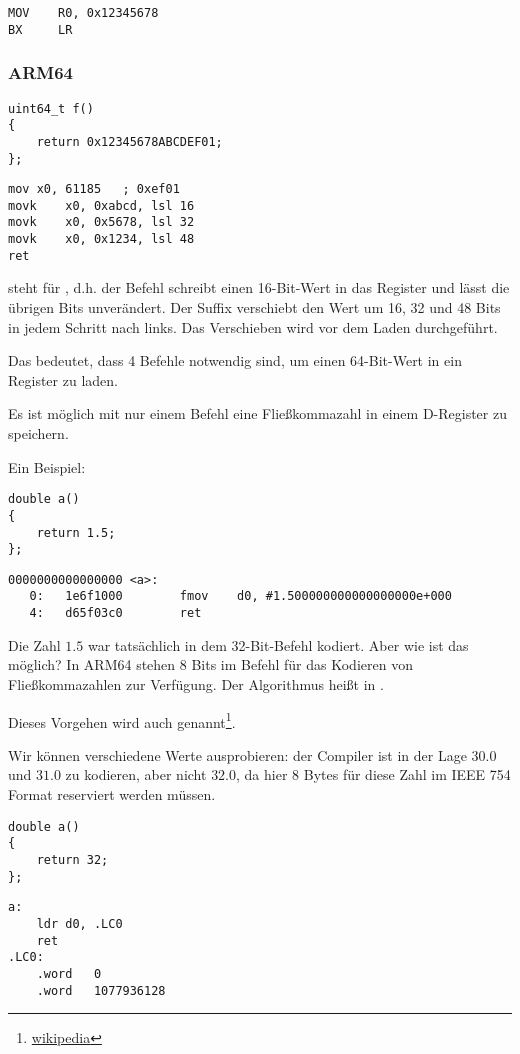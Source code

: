 \begin{lstlisting}[style=customasmARM]
MOV    R0, 0x12345678
BX     LR
\end{lstlisting}

\subsubsection{ARM64}

\begin{lstlisting}[style=customc]
uint64_t f()
{
	return 0x12345678ABCDEF01;
};
\end{lstlisting}

\begin{lstlisting}[caption=GCC 4.9.1 -O3,style=customasmARM]
mov	x0, 61185   ; 0xef01
movk	x0, 0xabcd, lsl 16
movk	x0, 0x5678, lsl 32
movk	x0, 0x1234, lsl 48
ret
\end{lstlisting}

 steht für , d.h. der Befehl schreibt einen 16-Bit-Wert in das Register und lässt die übrigen Bits
unverändert.
Der Suffix  verschiebt den Wert um 16, 32 und 48 Bits in jedem Schritt nach links. Das Verschieben wird vor dem
Laden durchgeführt.

Das bedeutet, dass 4 Befehle notwendig sind, um einen 64-Bit-Wert in ein Register zu laden.

Es ist möglich mit nur einem Befehl eine Fließkommazahl in einem D-Register zu speichern.

Ein Beispiel:

\begin{lstlisting}[style=customc]
double a()
{
	return 1.5;
};
\end{lstlisting}

\begin{lstlisting}[caption=GCC 4.9.1 -O3 + objdump,style=customasmARM]
0000000000000000 <a>:
   0:   1e6f1000        fmov    d0, #1.500000000000000000e+000
   4:   d65f03c0        ret
\end{lstlisting}
Die Zahl $1.5$ war tatsächlich in dem 32-Bit-Befehl kodiert. Aber wie ist das möglich?
In ARM64 stehen 8 Bits im  Befehl für das Kodieren von Fließkommazahlen zur Verfügung.
Der Algorithmus heißt  in \ARMSixFourRefURL. 


Dieses Vorgehen wird auch  genannt\footnote{\href{http://go.yurichev.com/17139}{wikipedia}}.

Wir können verschiedene Werte ausprobieren: der Compiler ist in der Lage $30.0$ und $31.0$ zu kodieren, aber nicht
$32.0$, da hier 8 Bytes für diese Zahl im IEEE 754 Format reserviert werden müssen.

\begin{lstlisting}[style=customc]
double a()
{
	return 32;
};
\end{lstlisting}

\begin{lstlisting}[caption=GCC 4.9.1 -O3,style=customasmARM]
a:
	ldr	d0, .LC0
	ret
.LC0:
	.word	0
	.word	1077936128
\end{lstlisting}
